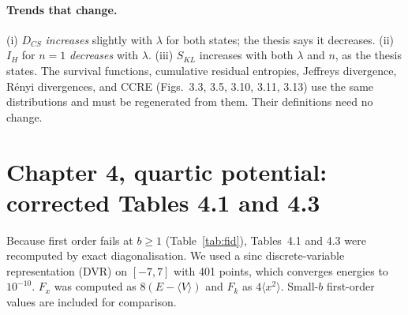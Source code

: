 \documentclass[11pt,a4paper]{article}
\begin{document}
\paragraph{Trends that change.} (i) $D_{CS}$ \emph{increases} slightly with $\lambda$ for
both states; the thesis says it decreases. (ii) $I_H$ for $n=1$ \emph{decreases} with
$\lambda$. (iii) $S_{KL}$ increases with both $\lambda$ and $n$, as the thesis states.
The survival functions, cumulative residual entropies, Jeffreys divergence, Rényi
divergences, and CCRE (Figs.~3.3, 3.5, 3.10, 3.11, 3.13) use the same distributions and
must be regenerated from them. Their definitions need no change.

\section{Chapter 4, quartic potential: corrected Tables 4.1 and 4.3}
\label{sec:q}

Because first order fails at $b\ge1$ (Table~\ref{tab:fid}), Tables~4.1 and 4.3 were
recomputed by exact diagonalisation. We used a sinc discrete-variable representation (DVR)
on $[-7,7]$ with 401 points, which converges energies to $10^{-10}$. $F_x$ was computed as
$8(E-\langle V\rangle)$ and $F_k$ as $4\langle x^2\rangle$. Small-$b$ first-order values are
included for comparison.
\end{document}
